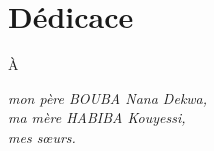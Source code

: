 \chapter*{Dédicace}

\renewcommand{\abstractnamefont}{\normalfont\Large\bfseries}


\hskip7mm
\begin{spacing}{1.3}
	\hspace{13cm}\Large{À}
	\begin{flushright}
	\itshape
mon père BOUBA Nana Dekwa,\\
ma mère HABIBA Kouyessi,\\
mes sœurs.\\
	\end{flushright}
\end{spacing}
